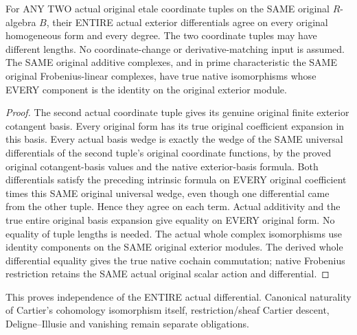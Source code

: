 \begin{theorem}
\label{thm:cartier-etale-whole-differential-coordinate-independence}
\leanok
For ANY TWO actual original etale coordinate tuples on the SAME original
$R$-algebra $B$, their ENTIRE actual exterior differentials agree on every
original homogeneous form and every degree. The two coordinate tuples may
have different lengths. No coordinate-change or derivative-matching input
is assumed. The SAME original additive complexes, and in prime characteristic
the SAME original Frobenius-linear complexes, have true native isomorphisms
whose EVERY component is the identity on the original exterior module.
\end{theorem}
\begin{proof}
The second actual coordinate tuple gives its genuine original finite
exterior cotangent basis. Every original form has its true original
coefficient expansion in this basis. Every actual basis wedge is exactly
the wedge of the SAME universal differentials of the second tuple's
original coordinate functions, by the proved original cotangent-basis
values and the native exterior-basis formula.
Both differentials satisfy the preceding intrinsic formula on EVERY
original coefficient times this SAME original universal wedge, even though
one differential came from the other tuple. Hence they agree on each term.
Actual additivity and the true entire original basis expansion give equality
on EVERY original form. No equality of tuple lengths is needed.
The actual whole complex isomorphisms use identity components on the SAME
original exterior modules. The derived whole differential equality gives
the true native cochain commutation; native Frobenius restriction retains
the SAME actual original scalar action and differential.
\end{proof}

This proves independence of the ENTIRE actual differential. Canonical
naturality of Cartier's cohomology isomorphism itself, restriction/sheaf
Cartier descent, Deligne--Illusie and vanishing remain separate obligations.
